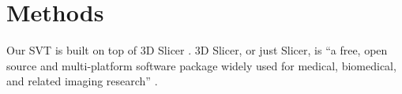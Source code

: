 \section{Methods}

Our \ac{SVT} is built on top of 3D Slicer \cite{fedorov_3d_2012}.
3D Slicer, or just Slicer, is ``a free, open source and multi-platform software package widely used for medical, biomedical, and related imaging research''%
.

